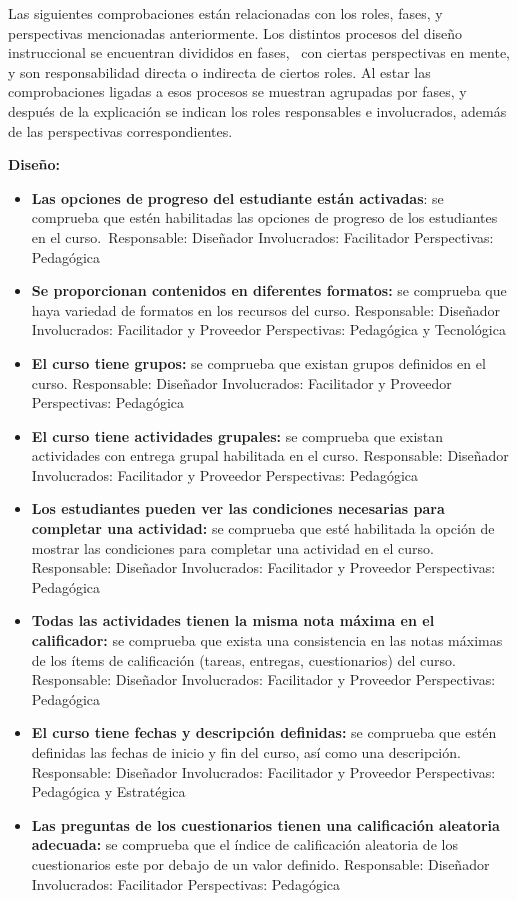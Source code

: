     Las siguientes comprobaciones están relacionadas con los roles, fases, y
    perspectivas mencionadas anteriormente. Los distintos procesos del
    diseño instruccional se encuentran divididos en fases, ~con ciertas
    perspectivas en mente, y son responsabilidad directa o indirecta de
    ciertos roles. Al estar las comprobaciones ligadas a esos procesos se
    muestran agrupadas por fases, y después de la explicación se indican los
    roles responsables e involucrados, además de las perspectivas
    correspondientes.
    
    \textbf{Diseño:}
    
    \begin{itemize}
    	\item
    	\textbf{Las opciones de progreso del estudiante están activadas}: se
    	comprueba que estén habilitadas las opciones de progreso de los
    	estudiantes en el curso.~{Responsable:} Diseñador
    	{Involucrados:} Facilitador {Perspectivas:} Pedagógica
    	\item
    	\textbf{Se proporcionan contenidos en diferentes formatos:} se
    	comprueba que haya variedad de formatos en los recursos del curso.
    	{Responsable:} Diseñador {Involucrados:} Facilitador y
    	Proveedor {Perspectivas:} Pedagógica y Tecnológica
    	\item
    	\textbf{El curso tiene grupos:} se comprueba que existan grupos
    	definidos en el curso. {Responsable:} Diseñador
    	{Involucrados:} Facilitador y Proveedor {Perspectivas:}
    	Pedagógica
    	\item
    	\textbf{El curso tiene actividades grupales:} se comprueba que existan
    	actividades con entrega grupal habilitada en el curso.
    	{Responsable:} Diseñador {Involucrados:} Facilitador y
    	Proveedor {Perspectivas:} Pedagógica
    	\item
    	\textbf{Los estudiantes pueden ver las condiciones necesarias para
    		completar una actividad:} se comprueba que esté habilitada la opción
    	de mostrar las condiciones para completar una actividad en el curso.
    	{Responsable:} Diseñador {Involucrados:} Facilitador y
    	Proveedor {Perspectivas:} Pedagógica
    	\item
    	\textbf{Todas las actividades tienen la misma nota máxima en el
    		calificador:} se comprueba que exista una consistencia en las notas
    	máximas de los ítems de calificación (tareas, entregas, cuestionarios)
    	del curso. {Responsable:} Diseñador {Involucrados:}
    	Facilitador y Proveedor {Perspectivas:} Pedagógica
        \item 
        \textbf{El curso tiene fechas y descripción definidas:} se comprueba que estén definidas las fechas de inicio y fin del curso, así como una descripción. {Responsable:} Diseñador {Involucrados:} Facilitador y Proveedor {Perspectivas:} Pedagógica y Estratégica
        \item 
        \textbf{Las preguntas de los cuestionarios tienen una calificación aleatoria adecuada:} se comprueba que el índice de calificación aleatoria de los cuestionarios este por debajo de un valor definido. {Responsable:} Diseñador {Involucrados:} Facilitador {Perspectivas:} Pedagógica
    \end{itemize}
    
